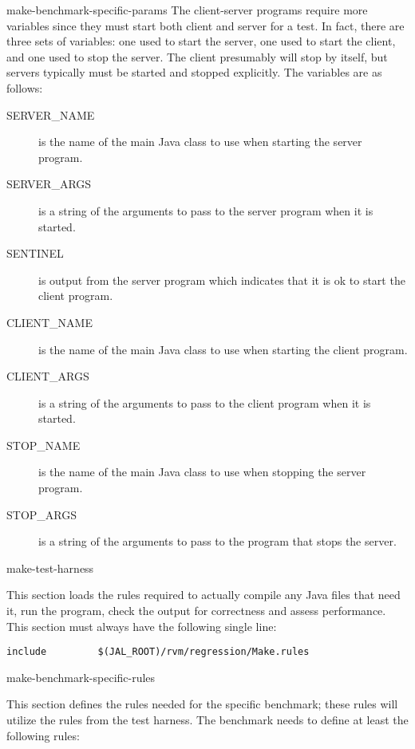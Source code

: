 \begin{description}
\begin{Label}{make-benchmark-specific-params}
 The client-server programs require more variables since they must
start both client and server for a test.  In fact, there are three
sets of variables: one used to start the server, one used to start the
client, and one used to stop the server.  The client presumably will
stop by itself, but servers typically must be started and stopped
explicitly.  The variables are as follows:
\begin{description}
\item[SERVER\_NAME] is the name of the main Java class to use when
starting the server program.
\item[SERVER\_ARGS] is a string of the arguments to pass to the server
program when it is started.
\item[SENTINEL] is output from the server program which indicates that
it is ok to start the client program.
\item[CLIENT\_NAME] is the name of the main Java class to use when
starting the client program.
\item[CLIENT\_ARGS] is a string of the arguments to pass to the client
program when it is started.
\item[STOP\_NAME] is the name of the main Java class to use when
stopping the server program.
\item[STOP\_ARGS] is a string of the arguments to pass to the program
that stops the server.
\end{description}
\end{Label}

\begin{Label}{make-test-harness}
\item[Include the test harness makefile]
  This section loads the rules
required to actually compile any Java files that need it, run the
program, check the output for correctness and assess performance.
This section must always have the following single line:
\begin{verbatim}
include         $(JAL_ROOT)/rvm/regression/Make.rules
\end{verbatim}
\end{Label}

\begin{Label}{make-benchmark-specific-rules}
\item[Define benchmark-specific rules]
  This section defines the rules
needed for the specific benchmark; these rules will utilize the rules
from the test harness.  The benchmark needs to define at least the
following rules:

\begin{description}


\end{description}
\end{Label}
\end{description}
